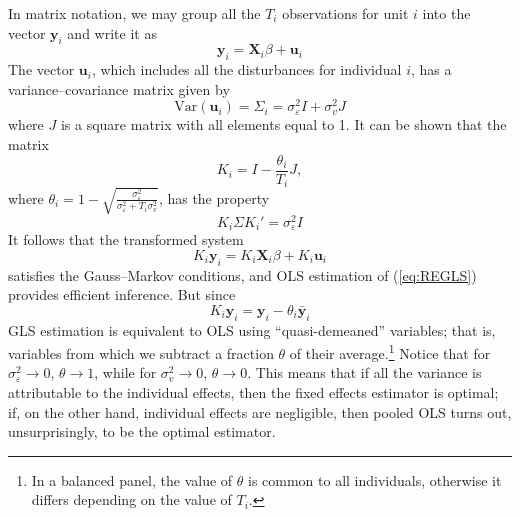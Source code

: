In matrix notation, we may group all the $T_i$ observations for unit
$i$ into the vector $\mathbf{y}_i$ and write it as
\begin{equation}
\label{eq:REvec}
\mathbf{y}_{i} = \mathbf{X}_{i} \beta + \mathbf{u}_i
\end{equation}
The vector $\mathbf{u}_i$, which includes all the disturbances for
individual $i$, has a variance--covariance matrix given by
\begin{equation}
\label{eq:CovMatUnitI}
  \mbox{Var}(\mathbf{u}_i) = \Sigma_i = \sigma^2_{\varepsilon} I + \sigma^2_{v} J
\end{equation}
where $J$ is a square matrix with all elements equal to 1. It can be
shown that the matrix
\[
  K_i = I - \frac{\theta_i}{T_i} J,
\]
where $\theta_i = 1 -
\sqrt{\frac{\sigma^2_{\varepsilon}}{\sigma^2_{\varepsilon} + T_i
    \sigma^2_{v}}}$, has the property
\[
  K_i \Sigma K_i' = \sigma^2_{\varepsilon} I
\]
It follows that the transformed system
\begin{equation}
\label{eq:REGLS}
K_i \mathbf{y}_{i} = K_i \mathbf{X}_{i} \beta + K_i \mathbf{u}_i
\end{equation}
satisfies the Gauss--Markov conditions, and OLS estimation of
(\ref{eq:REGLS}) provides efficient inference. But since 
\[
  K_i \mathbf{y}_{i} = \mathbf{y}_{i} - \theta_i \bar{\mathbf{y}}_{i}
\]
GLS estimation is equivalent to OLS using ``quasi-demeaned''
variables; that is, variables from which we subtract a fraction
$\theta$ of their average.\footnote{In a balanced panel, the value of
  $\theta$ is common to all individuals, otherwise it differs
  depending on the value of $T_i$.} Notice that for
$\sigma^2_{\varepsilon} \to 0$, $\theta \to 1$, while for
$\sigma^2_{v} \to 0$, $\theta \to 0$.  This means that if all the
variance is attributable to the individual effects, then the fixed
effects estimator is optimal; if, on the other hand, individual
effects are negligible, then pooled OLS turns out, unsurprisingly, to
be the optimal estimator.

